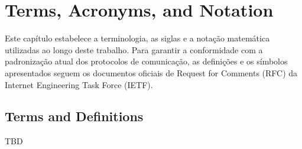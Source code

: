 \chapter{Terms, Acronyms, and Notation}
\label{chap:notation}

Este capítulo estabelece a terminologia, as siglas e a notação matemática utilizadas ao longo deste trabalho. Para garantir a conformidade com a padronização atual dos protocolos de comunicação, as definições e os símbolos apresentados seguem os documentos oficiais de Request for Comments (RFC) da Internet Engineering Task Force (IETF).

\section{Terms and Definitions}

TBD


